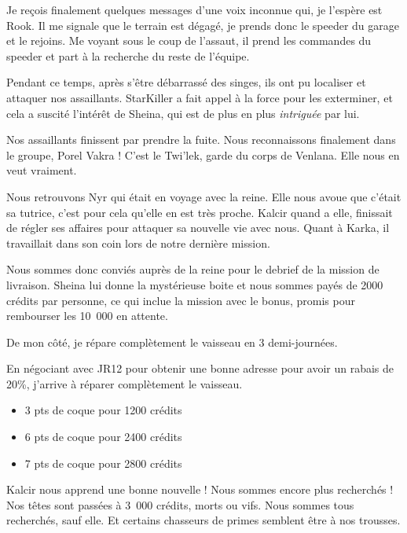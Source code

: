 \documentclass[a4paper,9pt,twoside,twocolumn,openany]{book}
\begin{document}
Je reçois finalement quelques messages d'une voix inconnue qui, je l'espère est Rook. Il me signale que le terrain est dégagé, je prends donc le speeder du garage et le rejoins. Me voyant sous le coup de l'assaut, il prend les commandes du speeder et part à la recherche du reste de l'équipe.

Pendant ce temps, après s'être débarrassé des singes, ils ont pu localiser et attaquer nos assaillants. StarKiller a fait appel à la force pour les exterminer, et cela a suscité l'intérêt de Sheina, qui est de plus en plus \emph{intriguée} par lui.

Nos assaillants finissent par prendre la fuite. Nous reconnaissons finalement dans le groupe, Porel Vakra ! C'est le Twi’lek, garde du corps de Venlana. Elle nous en veut vraiment.


\subtitle{30 septembre 2018 \newline Scénario custom}

Nous retrouvons Nyr qui était en voyage avec la reine. Elle nous avoue que c'était sa tutrice, c'est pour cela qu'elle en est très proche. Kalcir quand a elle, finissait de régler ses affaires pour attaquer sa nouvelle vie avec nous. Quant à Karka, il travaillait dans son coin lors de notre dernière mission.

Nous sommes donc conviés auprès de la reine pour le debrief de la mission de livraison. Sheina lui donne la mystérieuse boite et nous sommes payés de 2000 crédits par personne, ce qui inclue la mission avec le bonus, promis pour rembourser les 10\ 000 en attente.

De mon côté, je répare complètement le vaisseau en 3 demi-journées.

\begin{quotebox}
En négociant avec JR12 pour obtenir une bonne adresse pour avoir un rabais de 20\%, j'arrive à réparer complètement le vaisseau.
\begin{itemize}
    \item 3 pts de coque pour 1200 crédits
    \item 6 pts de coque pour 2400 crédits
    \item 7 pts de coque pour 2800 crédits
\end{itemize}
\end{quotebox}

Kalcir nous apprend une bonne nouvelle ! Nous sommes encore plus recherchés ! Nos têtes sont passées à 3\ 000 crédits, morts ou vifs. Nous sommes tous recherchés, sauf elle. Et certains chasseurs de primes semblent être à nos trousses.
\end{document}
